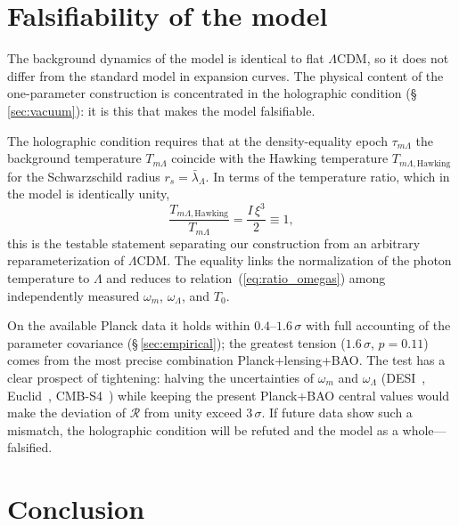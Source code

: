 \documentclass[10pt,a4paper]{article}
\begin{document}
\section{Falsifiability of the model}
\label{sec:falsif}

The background dynamics of the model is identical to flat $\Lambda$CDM, so it does not differ from the standard model in expansion curves. The physical content of the one-parameter construction is concentrated in the holographic condition (\S\,\ref{sec:vacuum}): it is this that makes the model falsifiable.

The holographic condition requires that at the density-equality epoch $\tau_{m\Lambda}$ the background temperature $T_{m\Lambda}$ coincide with the Hawking temperature $T_{m\Lambda\mathrm{, Hawking}}$ for the Schwarzschild radius $r_s=\bar\lambda_\Lambda$. In terms of the temperature ratio, which in the model is identically unity,
\begin{equation}
\frac{T_{m\Lambda\mathrm{, Hawking}}}{T_{m\Lambda}} = \frac{I\,\xi^3}{2} \equiv 1,
\end{equation}
this is the testable statement separating our construction from an arbitrary reparameterization of $\Lambda$CDM. The equality links the normalization of the photon temperature to $\Lambda$ and reduces to relation~(\ref{eq:ratio_omegas}) among independently measured $\omega_m$, $\omega_\Lambda$, and $T_0$.

On the available Planck data it holds within $0.4$--$1.6\,\sigma$ with full accounting of the parameter covariance (\S\,\ref{sec:empirical}); the greatest tension ($1.6\,\sigma$, $p=0.11$) comes from the most precise combination Planck+lensing+BAO. The test has a clear prospect of tightening: halving the uncertainties of $\omega_m$ and $\omega_\Lambda$ (DESI~\cite{DESI2024SV}, Euclid~\cite{Laureijs2011,Euclid2020}, CMB-S4~\cite{Abazajian2016}) while keeping the present Planck+BAO central values would make the deviation of $\mathcal{R}$ from unity exceed $3\,\sigma$. If future data show such a mismatch, the holographic condition will be refuted and the model as a whole---falsified.

\section{Conclusion}
\end{document}
